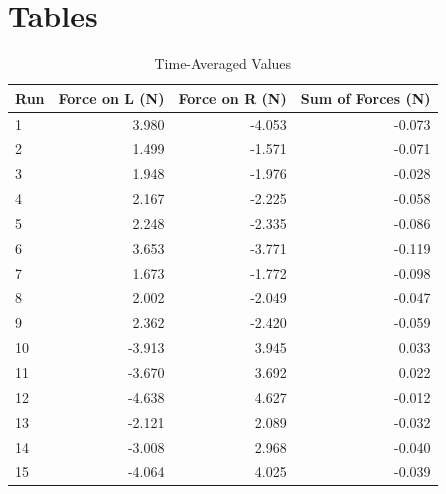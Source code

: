 \section{Tables}
\begin{table}[ht]
    \centering
    \begin{tabular}{|l|r|r|r|}
        \hline
        Run & Force on L (N) & Force on R (N) & Sum of Forces (N) \\
        \hline
        1 & 3.980 & -4.053 & -0.073 \\
        2 & 1.499 & -1.571 & -0.071 \\
        3 & 1.948 & -1.976 & -0.028 \\
        4 & 2.167 & -2.225 & -0.058 \\
        5 & 2.248 & -2.335 & -0.086 \\
        6 & 3.653 & -3.771 & -0.119 \\
        \hline
        7 & 1.673 & -1.772 & -0.098 \\
        8 & 2.002 & -2.049 & -0.047 \\
        9 & 2.362 & -2.420 & -0.059 \\
        \hline
        10 & -3.913 & 3.945 & 0.033 \\
        11 & -3.670 & 3.692 & 0.022 \\
        12 & -4.638 & 4.627 & -0.012 \\
        \hline
        13 & -2.121 & 2.089 & -0.032 \\
        14 & -3.008 & 2.968 & -0.040 \\
        15 & -4.064 & 4.025 & -0.039 \\
        \hline
    \end{tabular}
    \caption{Time-Averaged Values}
    \label{table:05.results}
\end{table}
\FloatBarrier
\newpage
